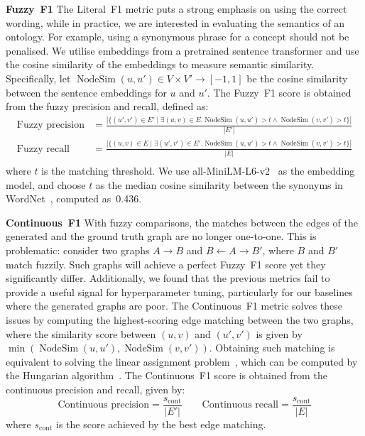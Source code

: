 \documentclass{article}
\DeclareMathOperator{\nodesim}{NodeSim}
\begin{document}
\textbf{Fuzzy~F1 }
The Literal~F1 metric puts a strong emphasis on using the correct wording, while in practice, we are interested in evaluating the semantics of an ontology. For example, using a synonymous phrase for a concept should not be penalised. We utilise embeddings from a pretrained sentence transformer and use the cosine similarity of the embeddings to measure semantic similarity. Specifically, let $\nodesim(u, u') \in V \times V' \to [-1, 1]$ be the cosine similarity between the sentence embeddings for $u$ and $u'$. The Fuzzy~F1 score is obtained from the fuzzy precision and recall, defined as:
\begin{equation*}
\begin{aligned}
\text{Fuzzy precision} &= \frac{|
\{(u', v') \in E' \mid \exists (u, v) \in E. 
\nodesim(u, u') > t \land \nodesim(v, v') > t
\}
|}{|E'|} \\
\text{Fuzzy recall} &= \frac{|
\{(u, v) \in E \mid \exists (u', v') \in E'. 
\nodesim(u, u') > t \land \nodesim(v, v') > t
\}
|}{|E|} \\
\end{aligned}
\end{equation*}
where $t$ is the matching threshold. We use all-MiniLM-L6-v2~\cite{wang2020minilm,reimers-2019-sentence-bert} as the embedding model, and choose $t$ as the median cosine similarity between the synonyms in WordNet~\cite{miller1995wordnet}, computed as~0.436.

\textbf{Continuous~F1 }
With fuzzy comparisons, the matches between the edges of the generated and the ground truth graph are no longer one-to-one. This is problematic: consider two graphs $A\!\rightarrow\!B$ and $B\!\leftarrow\!A\!\rightarrow\!B'$, where $B$ and $B'$ match fuzzily. Such graphs will achieve a perfect Fuzzy~F1 score yet they significantly differ. Additionally, we found that the previous metrics fail to provide a useful signal for hyperparameter tuning, particularly for our baselines where the generated graphs are poor. The Continuous~F1 metric solves these issues by computing the highest-scoring edge matching between the two graphs, where the similarity score between $(u, v)$ and $(u', v')$ is given by $\min(\nodesim(u, u'), \nodesim(v, v'))$. Obtaining such matching is equivalent to solving the linear assignment problem~\cite{martello1987linear}, which can be computed by the Hungarian algorithm~\cite{kuhn1955hungarian}. The Continuous~F1 score is obtained from the continuous precision and recall, given by:
\[
\text{Continuous precision} = \frac{s_\text{cont}}{|E'|} \qquad
\text{Continuous recall} = \frac{s_\text{cont}}{|E|}
\]
where $s_\text{cont}$ is the score achieved by the best edge matching.
\end{document}
